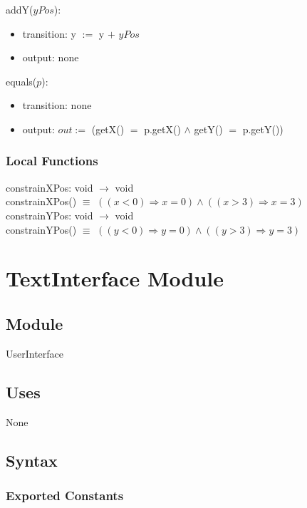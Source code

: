 \documentclass[12pt]{article}
\begin{document}
\noindent addY($yPos$):
\begin{itemize}
\item transition: y $:=$ y $+$ $yPos$
\item output: none
\end{itemize}

\noindent equals($p$):
\begin{itemize}
\item transition: none
\item output: $out := $ (getX() $=$ p.getX() $\land$ getY() $=$ p.getY())
\end{itemize}

\subsubsection* {Local Functions}

constrainXPos: void $\rightarrow$ void\\
constrainXPos() $\equiv$ $((x < 0) \Rightarrow x = 0) \land ((x > 3) \Rightarrow x = 3)$\\

\noindent constrainYPos: void $\rightarrow$ void\\
constrainYPos() $\equiv$ $((y < 0) \Rightarrow y = 0) \land ((y > 3) \Rightarrow y = 3)$\\

\newpage

\section* {TextInterface Module}

\subsection* {Module}

UserInterface

\subsection* {Uses}

None

\subsection* {Syntax}

\subsubsection* {Exported Constants}
\end{document}
